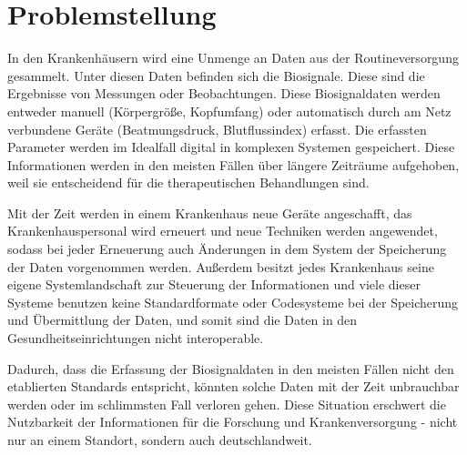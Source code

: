 \section{Problemstellung} \label{sec:problem}

In den Krankenhäusern wird eine Unmenge an Daten aus der Routineversorgung gesammelt. Unter diesen Daten befinden sich die Biosignale. Diese sind die Ergebnisse von Messungen oder Beobachtungen. Diese Biosignaldaten werden entweder manuell (Körpergröße, Kopfumfang) oder automatisch durch am Netz verbundene Geräte (Beatmungsdruck, Blutflussindex) erfasst. Die erfassten Parameter werden im Idealfall digital in komplexen Systemen gespeichert. Diese Informationen werden in den meisten Fällen über längere Zeiträume aufgehoben, weil sie entscheidend für die therapeutischen Behandlungen sind. 

Mit der Zeit werden in einem Krankenhaus neue Geräte angeschafft, das Krankenhauspersonal wird erneuert und neue Techniken werden angewendet, sodass bei jeder Erneuerung auch Änderungen in dem System der Speicherung der Daten vorgenommen werden. Außerdem besitzt jedes Krankenhaus seine eigene Systemlandschaft zur Steuerung der Informationen und viele dieser Systeme benutzen keine Standardformate oder Codesysteme bei der Speicherung und Übermittlung der Daten, und somit sind die Daten in den Gesundheitseinrichtungen nicht interoperable. 

Dadurch, dass die Erfassung der Biosignaldaten in den meisten Fällen nicht den etablierten Standards entspricht, könnten solche Daten mit der Zeit unbrauchbar werden oder im schlimmsten Fall verloren gehen. Diese Situation erschwert die Nutzbarkeit der Informationen für die Forschung und Krankenversorgung - nicht nur an einem Standort, sondern auch deutschlandweit.